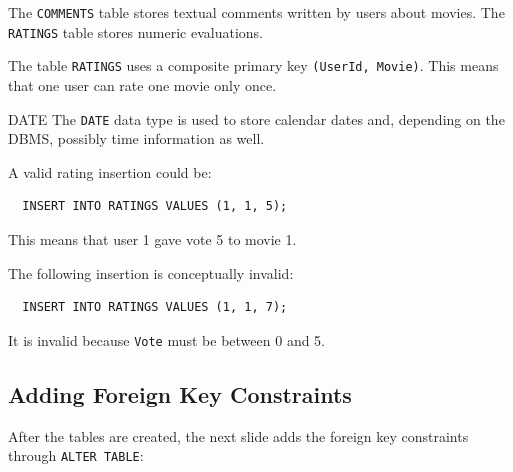  The \texttt{COMMENTS} table stores textual comments written by users about movies. The \texttt{RATINGS} table stores numeric evaluations.

 The table \texttt{RATINGS} uses a composite primary key \texttt{(UserId, Movie)}. This means that one user can rate one movie only once.

 \begin{defbox}{DATE}
  The \texttt{DATE} data type is used to store calendar dates and, depending on the DBMS, possibly time information as well.
 \end{defbox}

 \begin{example}
  A valid rating insertion could be:
  \begin{verbatim}
  INSERT INTO RATINGS VALUES (1, 1, 5);
  \end{verbatim}
  \vspace{-0.4cm}

  This means that user 1 gave vote 5 to movie 1.
 \end{example}

 \begin{example}
  The following insertion is conceptually invalid:
  \begin{verbatim}
  INSERT INTO RATINGS VALUES (1, 1, 7);
  \end{verbatim}
  \vspace{-0.4cm}

  It is invalid because \texttt{Vote} must be between 0 and 5.
 \end{example}

 \subsection{Adding Foreign Key Constraints}

 After the tables are created, the next slide adds the foreign key constraints through \texttt{ALTER TABLE}:

